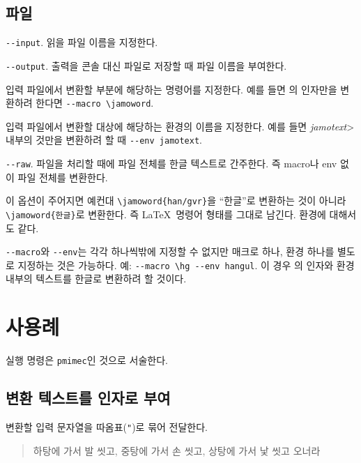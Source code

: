 \documentclass{simplman}
\newcommand*\env[1]{\<2\textit{#1}>}
\let\opt\stopt
\def\util#1{\texttt{#1}}
\begin{document}
\subsection*{파일}
\begin{description}\oblivoirlist
\item [\opt{-i}] \verb|--input|. 읽을 파일 이름을 지정한다.
\item [\opt{-o}] \verb|--output|. 출력을 콘솔 대신 파일로 저장할 때 파일 이름을 부여한다.
\item [\opt{--macro}] 입력 파일에서 변환할 부분에 해당하는 명령어를 지정한다. 예를 들면 \cmdprint{\jamoword}의 인자만을 변환하려 한다면 \verb|--macro \jamoword|.
\item [\opt{--env}] 입력 파일에서 변환할 대상에 해당하는 환경의 이름을 지정한다. 예를 들면 \env{jamotext} 내부의 것만을 변환하려 할 때 \verb|--env jamotext|.
\item [\opt{-r}] \verb|--raw|. 파일을 처리할 때에 파일 전체를 한글 텍스트로 간주한다. 즉 macro나 env 없이 파일 전체를 변환한다.
\item [\opt{--keep}] 이 옵션이 주어지면 예컨대 \verb|\jamoword{han/gvr}|을 ``한글''로 변환하는 것이 아니라 \verb|\jamoword{한글}|로 변환한다. 즉 \LaTeX\ 명령어 형태를 그대로 남긴다. 환경에 대해서도 같다. 
\end{description}
\verb|--macro|와 \verb|--env|는 각각 하나씩밖에 지정할 수 없지만 매크로 하나, 환경 하나를 별도로 지정하는 것은 가능하다. 예: \verb|--macro \hg --env hangul|. 이 경우 \cmdprint{\hg}의 인자와 \opt{hangul} 환경 내부의 텍스트를 한글로 변환하려 할 것이다.

\section{사용례}

실행 명령은 \util{pmimec}인 것으로 서술한다.

\subsection{변환 텍스트를 인자로 부여}

변환할 입력 문자열을 따옴표(\verb|"|)로 묶어 전달한다.
\begin{quote}\exemfont
하탕에 가서 발 씻고, 중탕에 가서 손 씻고, 상탕에 가서 낯 씻고 오너라
\end{quote}
\end{document}
